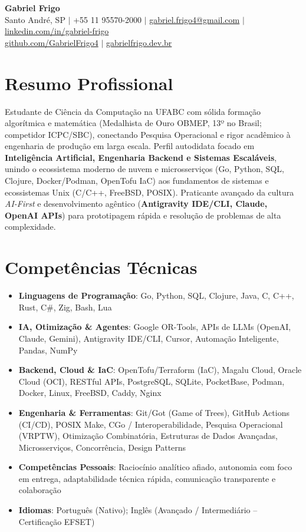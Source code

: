 \documentclass[letterpaper,10pt]{article}
\newcommand{\resumeItem}[1]{\item\small{#1}}
\newcommand{\resumeSubHeadingList}{\begin{itemize}[leftmargin=0.15in, label={}]}
\newcommand{\resumeSubHeadingListEnd}{\end{itemize}}
\begin{document}
\begin{center}
  \textbf{\Huge Gabriel Frigo} \\
  \small Santo André, SP $|$ +55 11 95570-2000 $|$ \href{mailto:gabriel.frigo4@gmail.com}{gabriel.frigo4@gmail.com} $|$
  \href{https://linkedin.com/in/gabriel-frigo-b6727b275/}{linkedin.com/in/gabriel-frigo} \\
  \href{https://github.com/GabrielFrigo4}{github.com/GabrielFrigo4} $|$
  \href{https://gabrielfrigo.dev.br}{gabrielfrigo.dev.br}
\end{center}

\section{Resumo Profissional}
Estudante de Ciência da Computação na UFABC com sólida formação algorítmica e matemática (Medalhista de Ouro OBMEP, 13º no Brasil; competidor ICPC/SBC), conectando Pesquisa Operacional e rigor acadêmico à engenharia de produção em larga escala. Perfil autodidata focado em \textbf{Inteligência Artificial, Engenharia Backend e Sistemas Escaláveis}, unindo o ecossistema moderno de nuvem e microsserviços (Go, Python, SQL, Clojure, Docker/Podman, OpenTofu IaC) aos fundamentos de sistemas e ecossistemas Unix (C/C++, FreeBSD, POSIX). Praticante avançado da cultura \textit{AI-First} e desenvolvimento agêntico (\textbf{Antigravity IDE/CLI, Claude, OpenAI APIs}) para prototipagem rápida e resolução de problemas de alta complexidade.

\section{Competências Técnicas}
\resumeSubHeadingList
  \resumeItem{\textbf{Linguagens de Programação}: Go, Python, SQL, Clojure, Java, C, C++, Rust, C\#, Zig, Bash, Lua}
  \resumeItem{\textbf{IA, Otimização \& Agentes}: Google OR-Tools, APIs de LLMs (OpenAI, Claude, Gemini), Antigravity IDE/CLI, Cursor, Automação Inteligente, Pandas, NumPy}
  \resumeItem{\textbf{Backend, Cloud \& IaC}: OpenTofu/Terraform (IaC), Magalu Cloud, Oracle Cloud (OCI), RESTful APIs, PostgreSQL, SQLite, PocketBase, Podman, Docker, Linux, FreeBSD, Caddy, Nginx}
  \resumeItem{\textbf{Engenharia \& Ferramentas}: Git/Got (Game of Trees), GitHub Actions (CI/CD), POSIX Make, CGo / Interoperabilidade, Pesquisa Operacional (VRPTW), Otimização Combinatória, Estruturas de Dados Avançadas, Microsserviços, Concorrência, Design Patterns}
  \resumeItem{\textbf{Competências Pessoais}: Raciocínio analítico afiado, autonomia com foco em entrega, adaptabilidade técnica rápida, comunicação transparente e colaboração}
  \resumeItem{\textbf{Idiomas}: Português (Nativo); Inglês (Avançado / Intermediário -- Certificação EFSET)}
\resumeSubHeadingListEnd
\end{document}
